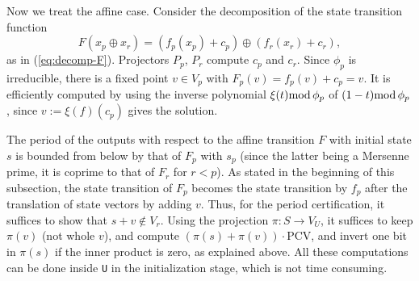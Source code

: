 \documentclass{svmult}
\def\bbf2{\ifmmode\mathbb{F}_2\else$\mathbb{F}_2$\fi}%
\begin{document}
Now we treat the affine case.
Consider the decomposition of the state transition function
$$
F(x_p\oplus x_r)=
(f_p(x_p)+c_p) \oplus (f_r(x_r)+c_r),
$$
as in (\ref{eq:decomp-F}).
Projectors $P_p$, $P_r$ compute $c_p$ and $c_r$.
Since $\phi_p$ is irreducible, there is a fixed point $v \in V_p$
with $F_p(v)=f_p(v)+c_p=v$. It is
efficiently computed by using the inverse polynomial
$\xi(t) \textrm{mod}\, \phi_p$ of $(1 - t) \textrm{mod}\, \phi_p$,
since $v:=\xi(f)(c_p)$ gives the solution.


The period of the outputs with respect to 
the affine transition $F$ with initial 
state $s$ is bounded from below
by that of $F_p$ with $s_p$ (since the latter being a Mersenne prime,
it is coprime to that of $F_r$ for $r<p$).
As stated in the beginning of this subsection,
the state transition of $F_p$ becomes the state transition 
by $f_p$ after the translation of state vectors by adding $v$. 
Thus, for the period certification, it suffices to 
show that $s + v \notin V_r$. Using the projection 
$\pi: S \to V_U$, it suffices to keep $\pi(v)$ (not whole $v$),
and compute $(\pi(s) + \pi(v))\cdot \mathrm{PCV}$, 
and invert one bit in $\pi(s)$ if the inner product is zero, as 
explained above. All these computations can be done
inside \texttt{U} in the initialization stage, which
is not time consuming. 

\end{document}
